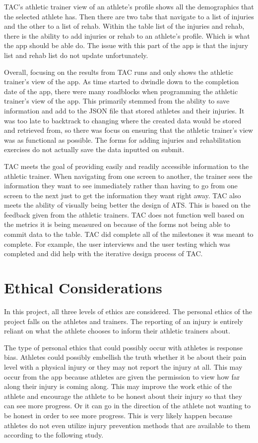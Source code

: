 \documentclass[10pt,twocolumn]{article}
\begin{document}
TAC's athletic trainer view of an athlete's profile shows all the demographics that the selected athlete has. Then there are two tabs that navigate to a list of injuries and the other to a list of rehab. Within the table list of the injuries and rehab, there is the ability to add injuries or rehab to an athlete's profile. Which is what the app should be able do. The issue with this part of the app is that the injury list and rehab list do not update unfortunately.

Overall, focusing on the results from TAC runs and only shows the athletic trainer's view of the app. As time started to dwindle down to the completion date of the app, there were many roadblocks when programming the athletic trainer's view of the app. This primarily stemmed from the ability to save information and add to the JSON file that stored athletes and their injuries. It was too late to backtrack to changing where the created data would be stored and retrieved from, so there was focus on ensuring that the athletic trainer's view was as functional as possible. The forms for adding injuries and rehabilitation exercises do not actually save the data inputted on submit.

TAC meets the goal of providing easily and readily accessible information to the athletic trainer. When navigating from one screen to another, the trainer sees the information they want to see immediately rather than having to go from one screen to the next just to get the information they want right away. TAC also meets the ability of visually being better the design of ATS. This is based on the feedback given from the athletic trainers. TAC does not function well based on the metrics it is being measured on because of the forms not being able to commit data to the table. TAC did complete all of the milestones it was meant to complete. For example, the user interviews and the user testing which was completed and did help with the iterative design process of TAC.

\section{Ethical Considerations}
In this project, all three levels of ethics are considered. The personal ethics of the project falls on the athletes and trainers. The reporting of an injury is entirely reliant on what the athlete chooses to inform their athletic trainers about.

The type of personal ethics that could possibly occur with athletes is response bias. Athletes could possibly embellish the truth whether it be about their pain level with a physical injury or they may not report the injury at all. This may occur from the app because athletes are given the permission to view how far along their injury is coming along. This may improve the work ethic of the athlete and encourage the athlete to be honest about their injury so that they can see more progress. Or it can go in the direction of the athlete not wanting to be honest in order to see more progress. This is very likely happen because athletes do not even utilize injury prevention methods that are available to them according to the following study. 
\end{document}

